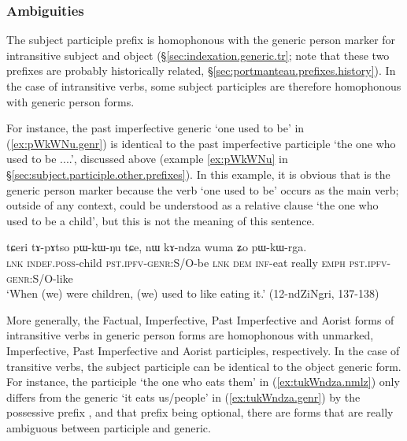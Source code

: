 \subsubsection{Ambiguities}  \label{sec:subject.participle.ambiguities}
The subject participle  prefix is homophonous with the generic person marker for intransitive subject and object (§\ref{sec:indexation.generic.tr}; note that these two prefixes are probably historically related, §\ref{sec:portmanteau.prefixes.history}). In the case of intransitive verbs, some subject participles are therefore homophonous with generic person forms. 

For instance, the past imperfective generic  `one used to be' in (\ref{ex:pWkWNu.genr}) is identical to the past imperfective participle  `the one who used to be ....', discussed above (example \ref{ex:pWkWNu} in §\ref{sec:subject.participle.other.prefixes}). In this example, it is obvious that  is the generic person marker because the verb  `one used to be' occurs as the main verb; outside of any context,   could be understood as a relative clause `the one who used to be a child', but this is not the meaning of this sentence. 

\begin{exe}
\ex \label{ex:pWkWNu.genr}
 \gll tɕeri tɤ-pɤtso pɯ-kɯ-ŋu tɕe, nɯ kɤ-ndza wuma ʑo pɯ-kɯ-rga. \\
 \textsc{lnk} \textsc{indef}.\textsc{poss}-child \textsc{pst}.\textsc{ipfv}-\textsc{genr}:S/O-be \textsc{lnk} \textsc{dem} \textsc{inf}-eat really \textsc{emph} \textsc{pst}.\textsc{ipfv}-\textsc{genr}:S/O-like \\
 \glt `When (we) were children, (we) used to like eating it.' (12-ndZiNgri, 137-138)
\end{exe}

More generally, the Factual, Imperfective, Past Imperfective and Aorist forms of intransitive verbs in generic person forms are homophonous with unmarked, Imperfective, Past Imperfective and Aorist participles, respectively. In the case of transitive verbs, the subject participle can be identical to the object generic form. For instance, the participle  `the one who eats them' in (\ref{ex:tukWndza.nmlz}) only differs from the generic  `it eats us/people' in  (\ref{ex:tukWndza.genr}) by the possessive prefix , and that prefix being optional, there are forms that are really ambiguous between participle and generic. 

